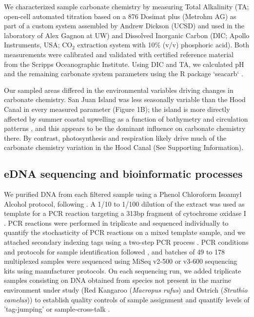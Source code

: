 \documentclass[11pt]{article}
\begin{document}
\begin{linenumbers}
We characterized sample carbonate chemistry by measuring Total Alkalinity (TA; open-cell automated titration based on a 876 Dosimat plus (Metrohm AG) as part of a custom system assembled by Andrew Dickson (UCSD) and used in the laboratory of Alex Gagnon at UW) and Dissolved Inorganic Carbon (DIC; Apollo Instruments, USA; CO$_2$ extraction system with 10\% (v/v) phosphoric acid). Both measurements were calibrated and validated with certified reference material from the Scripps Oceanographic Institute. Using DIC and TA, we calculated pH and the remaining carbonate system parameters using the R package `seacarb` \cite{seacarb}. 

Our sampled areas differed in the environmental variables driving changes in carbonate chemistry. San Juan Island was less seasonally variable than the Hood Canal in every measured parameter (Figure 1B); the island is more directly affected by summer coastal upwelling as a function of bathymetry and circulation patterns \cite{murray2015inland}, and this appears to be the dominant influence on carbonate chemistry there. By contrast, photosynthesis and respiration likely drive much of the carbonate chemistry variation in the Hood Canal (See Supporting Information). 

\subsection*{eDNA sequencing and bioinformatic processes}
We purified DNA from each filtered sample using a Phenol Chloroform Isoamyl Alcohol protocol, following \cite{renshaw2015room}.  A 1/10 to 1/100 dilution of the extract was used as template for a PCR reaction targeting a 313bp fragment of cytochrome oxidase I \cite{leray_new_2013}. PCR reactions were performed in triplicate and sequenced individually to quantify the stochasticity of PCR reactions on a mixed template sample, and we attached secondary indexing tags using a two-step PCR process \cite{odonnellPrimers}. PCR conditions and protocols for sample identification followed \cite{kelly2018tides}, and batches of 49 to 178 multiplexed samples were sequenced using MiSeq v2-500 or v3-600 sequencing kits using manufacturer protocols. On each sequencing run, we added triplicate samples consisting on DNA obtained from species not present in the marine environment under study (Red Kangaroo (\textit{Macropus rufus}) and Ostrich (\textit{Struthio camelus})) to establish quality controls of sample assignment and quantify levels of 'tag-jumping' or sample-cross-talk \cite{schnell2015tag}. 


\end{linenumbers}
\end{document}
